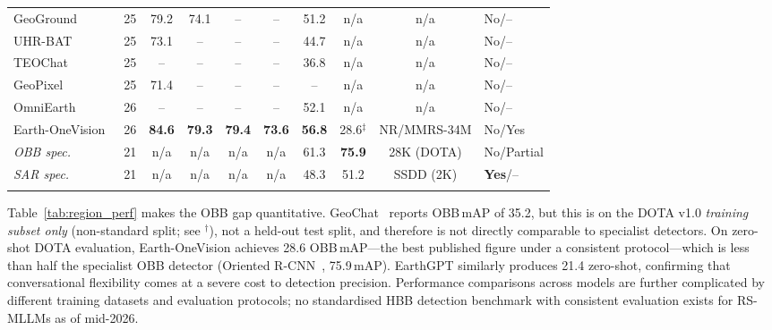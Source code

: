 \begin{table}[t]
\begin{tabular*}{\textwidth}{@{\extracolsep\fill}lp{0.25cm}cccccccp{1.3cm}}
GeoGround~\cite{geoground2025}
  & 25 & 79.2 & 74.1 & -- & -- & 51.2 & n/a & n/a & No/-- \\
UHR-BAT~\cite{uhrbat2025}
  & 25 & 73.1 & -- & -- & -- & 44.7 & n/a & n/a & No/-- \\
TEOChat~\cite{teochat2025}
  & 25 & -- & -- & -- & -- & 36.8 & n/a & n/a & No/-- \\
GeoPixel~\cite{geopixel2025}
  & 25 & 71.4 & -- & -- & -- & -- & n/a & n/a & No/-- \\
OmniEarth~\cite{omniearth2026b}
  & 26 & -- & -- & -- & -- & 52.1 & n/a & n/a & No/-- \\
Earth-OneVision~\cite{earthonevision2026}
  & 26 & \textbf{84.6} & \textbf{79.3} & \textbf{79.4} & \textbf{73.6} & \textbf{56.8} & 28.6$^\ddagger$ & NR/MMRS-34M & No/Yes \\
\midrule
\textit{OBB spec.}~\cite{xie2021orientedrcnn}
  & 21 & n/a & n/a & n/a & n/a & 61.3 & \textbf{75.9} & 28K (DOTA) & No/Partial \\
\textit{SAR spec.}~\cite{ssdd2021}
  & 21 & n/a & n/a & n/a & n/a & 48.3 & 51.2 & SSDD (2K) & \textbf{Yes}/-- \\
\botrule
\end{tabular*}
\end{table}

Table~\ref{tab:region_perf} makes the OBB gap quantitative. GeoChat~\cite{geochat2024}
reports OBB\,mAP of 35.2, but this is on the DOTA v1.0 \emph{training subset only}
(non-standard split; see $^\dagger$), not a held-out test split, and therefore is not
directly comparable to specialist detectors. On zero-shot DOTA evaluation,
Earth-OneVision achieves 28.6 OBB\,mAP---the best published figure under a consistent
protocol---which is less than half the specialist OBB detector
(Oriented R-CNN~\cite{xie2021orientedrcnn}, 75.9\,mAP). EarthGPT similarly
produces 21.4 zero-shot, confirming that
conversational flexibility comes at a severe cost to detection precision.
Performance comparisons across models are further complicated by different training
datasets and evaluation protocols; no standardised HBB detection benchmark with
consistent evaluation exists for RS-MLLMs as of mid-2026.

